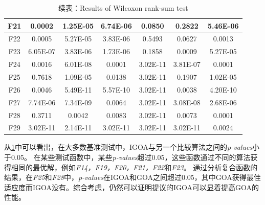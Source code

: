 \begin{table}[!htbp]
    \ContinuedFloat%
    \centering
    \caption{续表：Results of Wilcoxon rank-sum test}\label{tab:results_wilcoxon_rank_sum_test_IGOA}
    \renewcommand\arraystretch{1.3} 
    \begin{tabular}{*{7}{c}}
    {F21}& 0.0002&1.25E-05&6.74E-06&0.0850&0.2822&5.46E-06\\\hline
    {F22}& 0.0005&5.27E-05&3.83E-06&0.5493&0.0627&0.0013\\\hline
    {F23}& 6.05E-07&3.83E-06&1.73E-06&0.1858&0.0009&5.27E-05\\\hline
    {F24}& 0.0016&6.01E-08&0.0001&3.02E-11&3.81E-07&0.0001\\\hline
    {F25}& 0.7618&1.09E-05&0.0138&3.02E-11&0.1907&1.02E-05\\\hline
    {F26}& 0.0046&5.49E-11&5.57E-10&3.02E-11&0.0038&4.20E-10\\\hline
    {F27}& 7.74E-06&7.34E-09&0.0064&3.02E-11&3.08E-08&2.68E-06\\\hline
    {F28}& 0.3711&0.0042&0.0083&3.02E-11&0.0073&0.0001\\\hline
    {F29}& 3.02E-11&2.14E-11&3.02E-11&3.02E-11&3.02E-11&0.0024\\\hline
    
\end{tabular}
\end{table}

从\ref{tab:results_wilcoxon_rank_sum_test_IGOA}中可以看出，在大多数基准测试中，IGOA与另一个比较算法之间的\emph {p-values}小于0.05。 在某些测试函数中，某些\emph{p-values}超过0.05，这些函数通过不同的算法获得相同的最优解，例如\emph{F14，F19，F20，F21，F22}和\emph{F23}。 通过分析复合函数的结果，在\emph{F25}和\emph{F28}中，\emph{p-values}在IGOA和GOA之间超过0.05，其中GOA获得最佳适应度而IGOA没有。综合考虑，仍然可以证明提议的IGOA可以显着提高GOA的性能。
